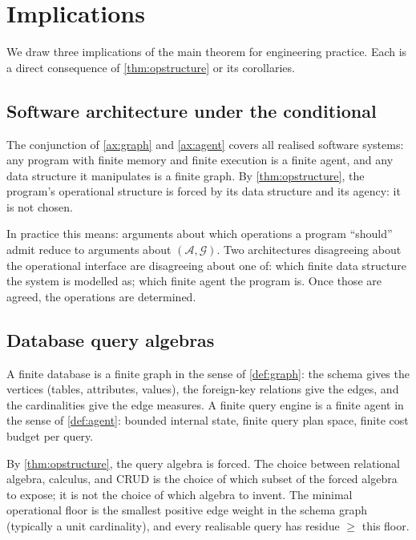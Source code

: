 \documentclass[11pt,twocolumn,a4paper]{article}
\theoremstyle{thmstyle}
\theoremstyle{definition}
\theoremstyle{remark}
\newcommand{\Graph}{\mathcal{G}}
\newcommand{\Agent}{\mathcal{A}}
\begin{document}
\section{Implications}
\label{sec:implications}

We draw three implications of the main theorem for engineering
practice. Each is a direct consequence of \cref{thm:opstructure} or
its corollaries.

\subsection{Software architecture under the conditional}

The conjunction of \cref{ax:graph} and \cref{ax:agent} covers all
realised software systems: any program with finite memory and
finite execution is a finite agent, and any data structure it
manipulates is a finite graph. By \cref{thm:opstructure}, the
program's operational structure is forced by its data structure and
its agency: it is not chosen.

In practice this means: arguments about which operations a program
``should'' admit reduce to arguments about $(\Agent, \Graph)$.
Two architectures disagreeing about the operational interface are
disagreeing about one of: which finite data structure the system is
modelled as; which finite agent the program is. Once those are
agreed, the operations are determined.

\subsection{Database query algebras}

A finite database is a finite graph in the sense of
\cref{def:graph}: the schema gives the vertices (tables, attributes,
values), the foreign-key relations give the edges, and the
cardinalities give the edge measures. A finite query engine is a
finite agent in the sense of \cref{def:agent}: bounded internal
state, finite query plan space, finite cost budget per query.

By \cref{thm:opstructure}, the query algebra is forced. The choice
between relational algebra, calculus, and CRUD is the choice of
which subset of the forced algebra to expose; it is not the choice
of which algebra to invent. The minimal operational floor is the
smallest positive edge weight in the schema graph (typically a unit
cardinality), and every realisable query has residue $\geq$ this
floor.
\end{document}
